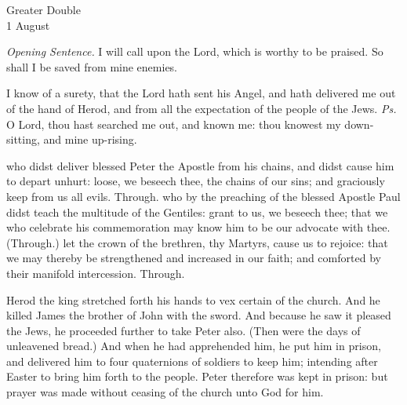\begin{inhead}
    {Greater Double\\
1 August}
\end{inhead}
\par\noindent
\textit{Opening Sentence.} I will call upon the Lord, which is worthy to be praised. So shall I be saved from mine enemies.%
\par\noindent
\par\noindent
{}
\par\noindent
{}

\introit
{} I know of a surety, that the Lord hath sent his Angel, and hath delivered me out of the hand of Herod, and from all the expectation of the people of the Jews. \textit{Ps.} O Lord, thou hast searched me out, and known me: thou knowest my down-sitting, and mine up-rising.

\collect
{} who didst deliver blessed Peter the Apostle from his chains, and didst cause him to depart unhurt: loose, we beseech thee, the chains of our sins; and graciously keep from us all evils. Through.
 who by the preaching of the blessed Apostle Paul didst teach the multitude of the Gentiles: grant to us, we beseech thee; that we who celebrate his commemoration may know him to be our advocate with thee. (Through.)
 let the crown of the brethren, thy Martyrs, cause us to rejoice: that we may thereby be strengthened and increased in our faith; and comforted by their manifold intercession. Through.

 Herod the king stretched forth his hands to vex certain of the church. And he killed James the brother of John with the sword. And because he saw it pleased the Jews, he proceeded further to take Peter also. (Then were the days of unleavened bread.) And when he had apprehended him, he put him in prison, and delivered him to four quaternions of soldiers to keep him; intending after Easter to bring him forth to the people. Peter therefore was kept in prison: but prayer was made without ceasing of the church unto God for him.

